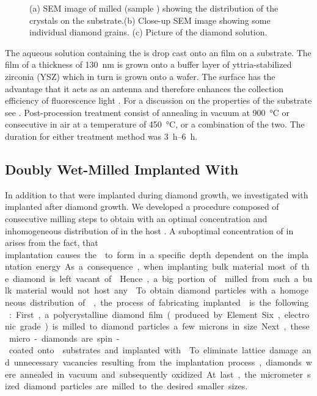 \begin{figure}[!htb]
\begin{minipage}[b]{0.49\textwidth}
\begin{subfigure}[b]{\linewidth}
		         			\caption{}\label{subfig::diamond_solution}
		       		\end{subfigure}
		     	\end{minipage}
			\caption[Pictures of wet-milled \nds.]{(a) SEM image of milled \nds (sample \insituH) showing the distribution of the \nd crystals on the \ir substrate.(b) Close-up SEM image showing some individual diamond grains. (c) Picture of the diamond solution.}\label{fig::pics_wetmilled}
		\end{figure}

		The aqueous solution containing the \nds is drop cast onto an \ir film on a \Si substrate.
		The \ir film of a thickness of \SI{130}{nm} is grown onto a buffer layer of yttria-stabilized zirconia (YSZ) which in turn is grown onto a \Si wafer.
		The \ir surface has the advantage that it acts as an antenna and therefore enhances the collection efficiency of fluorescence light \cite{Neu2012a}. For a discussion on the properties of the substrate see .
		Post-procession treatment consist of annealing in vacuum at \SI{900}{\degreeCelsius} or consecutive \ox in air at a temperature of \SI{450}{\degreeCelsius}, or a combination of the two.
		The duration for either treatment method was \SIrange{3}{6}{\hour}.

	\subsection{Doubly Wet-Milled \Nds Implanted With \Si}\label{subsec::2_milled_nds}

		In addition to \sivs that were implanted during diamond growth, we investigated \nds with \sivs implanted after diamond growth.
		We developed a procedure composed of consecutive milling steps to obtain \nds with an optimal concentration and inhomogeneous distribution of \sivs in the host \nds.
		A suboptimal concentration of \sivs in \nds arises from the fact, that \si implantation causes the \sivs to form in a specific depth dependent on the implantation energy.
		As a consequence, when implanting bulk material most of the diamond is left vacant of \sivs.
		Hence, a big portion of \nds milled from such a bulk material would not host any \sivs.
	
			To obtain diamond particles with a homogeneous distribution of \sivs, the process of fabricating implanted \nds is the following:
		First, a polycrystalline diamond film (produced by Element Six, electronic grade) is milled to diamond particles a few microns in size.
		Next, these micro-diamonds are spin-coated onto \ir substrates and implanted with .
		To eliminate lattice damage and unnecessary vacancies resulting from the implantation process, diamonds were annealed in vacuum and subsequently oxidized.
		At last, the micrometer sized diamond particles are milled to the desired smaller sizes.
	
